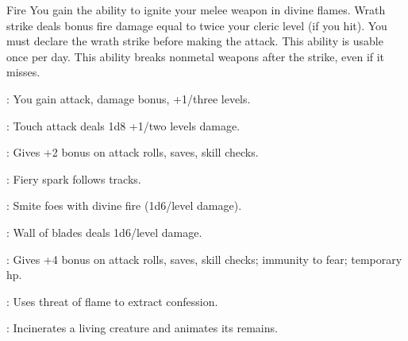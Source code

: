{Fire}
{You gain the ability to ignite your melee weapon in divine flames. Wrath strike deals bonus fire damage equal to twice your cleric level (if you hit). You must declare the wrath strike before making the attack. This ability is usable once per day. This ability breaks nonmetal weapons after the strike, even if it misses.}
{
	\item {}: You gain attack, damage bonus, +1/three levels.
	\item {}: Touch attack deals 1d8 +1/two levels damage.
	\item {}: Gives +2 bonus on attack rolls, saves, skill checks.
	\item {}: Fiery spark follows tracks.
	\item {}: Smite foes with divine fire (1d6/level damage).
	\item {}: Wall of blades deals 1d6/level damage.
	\item {}: Gives +4 bonus on attack rolls, saves, skill checks; immunity to fear; temporary hp.
	\item {}: Uses threat of flame to extract confession.
	\item {}: Incinerates a living creature and animates its remains.
}